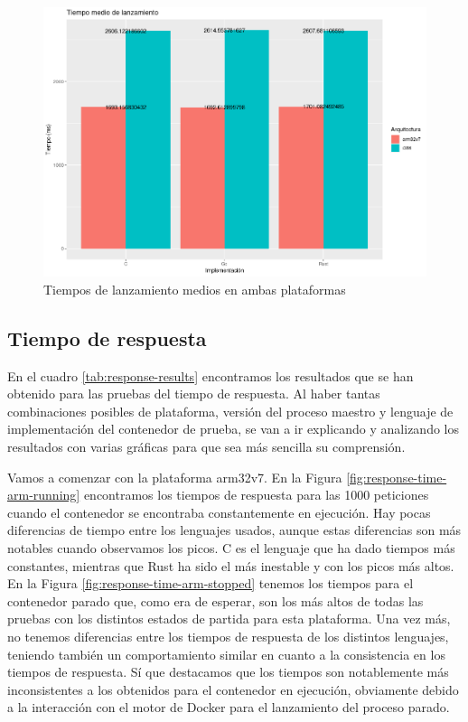 \begin{figure}
    \centering
    \includegraphics[width=\textwidth]{images/start-time/mean.png}
    \caption{Tiempos de lanzamiento medios en ambas plataformas}
    \label{fig:start-time-mean}
\end{figure}

\newpage

\subsection{Tiempo de respuesta}

En el cuadro \ref{tab:response-results} encontramos los resultados que se han
obtenido para las pruebas del tiempo de respuesta. Al haber tantas combinaciones
posibles de plataforma, versión del proceso maestro y lenguaje de implementación
del contenedor de prueba, se van a ir explicando y analizando los resultados con
varias gráficas para que sea más sencilla su comprensión.

Vamos a comenzar con la plataforma arm32v7. En la Figura
\ref{fig:response-time-arm-running} encontramos los tiempos de respuesta para
las 1000 peticiones cuando el contenedor se encontraba constantemente en
ejecución. Hay pocas diferencias de tiempo entre los lenguajes usados, aunque
estas diferencias son más notables cuando observamos los picos. C es el lenguaje
que ha dado tiempos más constantes, mientras que Rust ha sido el más inestable y
con los picos más altos. En la Figura \ref{fig:response-time-arm-stopped}
tenemos los tiempos para el contenedor parado que, como era de esperar, son los
más altos de todas las pruebas con los distintos estados de partida para esta
plataforma. Una vez más, no tenemos diferencias entre los tiempos de respuesta
de los distintos lenguajes, teniendo también un comportamiento similar en cuanto
a la consistencia en los tiempos de respuesta. Sí que destacamos que los tiempos
son notablemente más inconsistentes a los obtenidos para el contenedor en
ejecución, obviamente debido a la interacción con el motor de Docker para el
lanzamiento del proceso parado.

